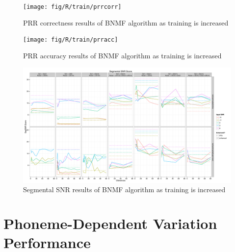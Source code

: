 \begin{figure}[p]
\noindent \begin{centering}
\texttt{[image: fig/R/train/prrcorr]}
\par\end{centering}

\protect\caption{\label{fig:vary-train-prrcorr} \acs{PRR} correctness results of
\acs{BNMF} algorithm as training is increased}
\end{figure}


\begin{figure}[p]
\noindent \begin{centering}
\texttt{[image: fig/R/train/prracc]}
\par\end{centering}

\protect\caption{\label{fig:vary-train-prracc} \acs{PRR} accuracy results of \acs{BNMF}
algorithm as training is increased}
\end{figure}


\begin{figure}[p]
\noindent \begin{centering}
\includegraphics[angle=90,width=1\textwidth,height=0.95\textheight]{fig/R/train/segSNR}
\par\end{centering}

\protect\caption{\label{fig:vary-train-segsnr}Segmental \acs{SNR} results of \acs{BNMF}
algorithm as training is increased}
\end{figure}


\clearpage{}


\section{Phoneme-Dependent Variation Performance}

